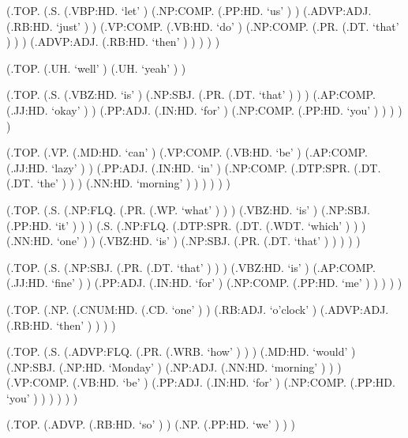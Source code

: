 \documentclass[10pt]{article}
\begin{document}
\begin{parsetree}  (.TOP. (.S. (.VBP:HD. `let' ) (.NP:COMP. (.PP:HD. `us' ) ) (.ADVP:ADJ. (.RB:HD. `just' ) ) (.VP:COMP. (.VB:HD. `do' ) (.NP:COMP. (.PR. (.DT. `that' ) ) ) (.ADVP:ADJ. (.RB:HD. `then' ) ) ) ) ) \end{parsetree}

\begin{parsetree}  (.TOP. (.UH. `well' ) (.UH. `yeah' ) ) \end{parsetree}

\begin{parsetree}  (.TOP. (.S. (.VBZ:HD. `is' ) (.NP:SBJ. (.PR. (.DT. `that' ) ) ) (.AP:COMP. (.JJ:HD. `okay' ) ) (.PP:ADJ. (.IN:HD. `for' ) (.NP:COMP. (.PP:HD. `you' ) ) ) ) ) \end{parsetree}

\begin{parsetree}  (.TOP. (.VP. (.MD:HD. `can' ) (.VP:COMP. (.VB:HD. `be' ) (.AP:COMP. (.JJ:HD. `lazy' ) ) (.PP:ADJ. (.IN:HD. `in' ) (.NP:COMP. (.DTP:SPR. (.DT. (.DT. `the' ) ) ) (.NN:HD. `morning' ) ) ) ) ) ) \end{parsetree}

\begin{parsetree}  (.TOP. (.S. (.NP:FLQ. (.PR. (.WP. `what' ) ) ) (.VBZ:HD. `is' ) (.NP:SBJ. (.PP:HD. `it' ) ) ) (.S. (.NP:FLQ. (.DTP:SPR. (.DT. (.WDT. `which' ) ) ) (.NN:HD. `one' ) ) (.VBZ:HD. `is' ) (.NP:SBJ. (.PR. (.DT. `that' ) ) ) ) ) \end{parsetree}

\begin{parsetree}  (.TOP. (.S. (.NP:SBJ. (.PR. (.DT. `that' ) ) ) (.VBZ:HD. `is' ) (.AP:COMP. (.JJ:HD. `fine' ) ) (.PP:ADJ. (.IN:HD. `for' ) (.NP:COMP. (.PP:HD. `me' ) ) ) ) ) \end{parsetree}

\begin{parsetree}  (.TOP. (.NP. (.CNUM:HD. (.CD. `one' ) ) (.RB:ADJ. `o'clock' ) (.ADVP:ADJ. (.RB:HD. `then' ) ) ) ) \end{parsetree}

\begin{parsetree}  (.TOP. (.S. (.ADVP:FLQ. (.PR. (.WRB. `how' ) ) ) (.MD:HD. `would' ) (.NP:SBJ. (.NP:HD. `Monday' ) (.NP:ADJ. (.NN:HD. `morning' ) ) ) (.VP:COMP. (.VB:HD. `be' ) (.PP:ADJ. (.IN:HD. `for' ) (.NP:COMP. (.PP:HD. `you' ) ) ) ) ) ) \end{parsetree}

\begin{parsetree}  (.TOP. (.ADVP. (.RB:HD. `so' ) ) (.NP. (.PP:HD. `we' ) ) ) \end{parsetree}
\end{document}

